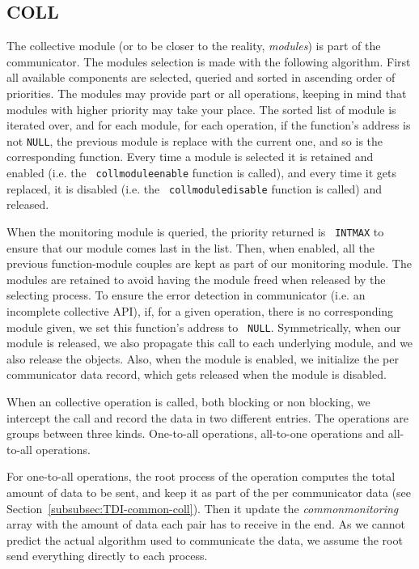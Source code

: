 \subsection{COLL}
\label{subsec:TDI-coll}

The collective module (or to be closer to the reality, {\it modules})
is part of the communicator. The modules selection is made with the
following algorithm. First all available components are selected,
queried and sorted in ascending order of priorities. The modules may
provide part or all operations, keeping in mind that modules with
higher priority may take your place. The sorted list of module is
iterated over, and for each module, for each operation, if the
function's address is not {\tt NULL}, the previous module is replace
with the current one, and so is the corresponding function. Every time
a module is selected it is retained and enabled (i.e. the {\tt
  coll\brkunds{}module\brkunds{}enable} function is called), and every
time it gets replaced, it is disabled (i.e. the {\tt
  coll\brkunds{}module\brkunds{}disable} function is called) and
released.

When the monitoring module is queried, the priority returned is {\tt
  INT\brkunds{}MAX} to ensure that our module comes last in the
list. Then, when enabled, all the previous function-module couples are
kept as part of our monitoring module. The modules are retained to
avoid having the module freed when released by the selecting
process. To ensure the error detection in communicator (i.e. an
incomplete collective API), if, for a given operation, there is no
corresponding module given, we set this function's address to {\tt
  NULL}. Symmetrically, when our module is released, we also propagate
this call to each underlying module, and we also release the
objects. Also, when the module is enabled, we initialize the per
communicator data record, which gets released when the module is
disabled.

When an collective operation is called, both blocking or non blocking,
we intercept the call and record the data in two different
entries. The operations are groups between three kinds. One-to-all
operations, all-to-one operations and all-to-all operations.

For one-to-all operations, the root process of the operation computes
the total amount of data to be sent, and keep it as part of the per
communicator data (see Section~\ref{subsubsec:TDI-common-coll}). Then
it update the {\it common\brkunds{}monitoring} array with the amount
of data each pair has to receive in the end. As we cannot predict the
actual algorithm used to communicate the data, we assume the root send
everything directly to each process.

